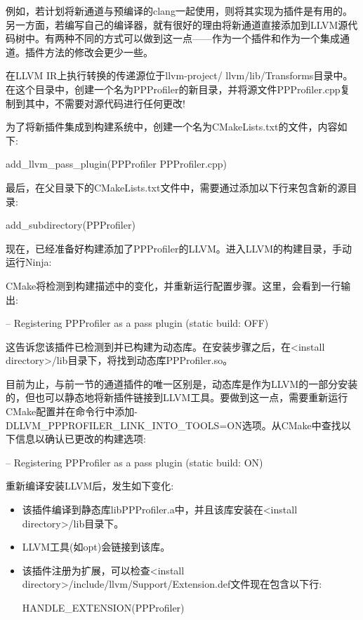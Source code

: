 例如，若计划将新通道与预编译的clang一起使用，则将其实现为插件是有用的。另一方面，若编写自己的编译器，就有很好的理由将新通道直接添加到LLVM源代码树中。有两种不同的方式可以做到这一点——作为一个插件和作为一个集成通道。插件方法的修改会更少一些。


在LLVM IR上执行转换的传递源位于llvm-project/ llvm/lib/Transforms目录中。在这个目录中，创建一个名为PPProfiler的新目录，并将源文件PPProfiler.cpp复制到其中，不需要对源代码进行任何更改!

为了将新插件集成到构建系统中，创建一个名为CMakeLists.txt的文件，内容如下:

\begin{cmake}
add_llvm_pass_plugin(PPProfiler PPProfiler.cpp)
\end{cmake}

最后，在父目录下的CMakeLists.txt文件中，需要通过添加以下行来包含新的源目录:

\begin{cmake}
add_subdirectory(PPProfiler)
\end{cmake}

现在，已经准备好构建添加了PPProfiler的LLVM。进入LLVM的构建目录，手动运行Ninja:


CMake将检测到构建描述中的变化，并重新运行配置步骤。这里，会看到一行输出:

\begin{shell}
-- Registering PPProfiler as a pass plugin (static build: OFF)
\end{shell}

这告诉您该插件已检测到并已构建为动态库。在安装步骤之后，在<install directory>/lib目录下，将找到动态库PPProfiler.so。

目前为止，与前一节的通道插件的唯一区别是，动态库是作为LLVM的一部分安装的，但也可以静态地将新插件链接到LLVM工具。要做到这一点，需要重新运行CMake配置并在命令行中添加-DLLVM\_PPPROFILER\_LINK\_INTO\_TOOLS=ON选项。从CMake中查找以下信息以确认已更改的构建选项:

\begin{shell}
-- Registering PPProfiler as a pass plugin (static build: ON)
\end{shell}

重新编译安装LLVM后，发生如下变化:

\begin{itemize}
\item
该插件编译到静态库libPPProfiler.a中，并且该库安装在<install directory>/lib目录下。

\item
LLVM工具(如opt)会链接到该库。

\item
该插件注册为扩展，可以检查<install directory>/include/llvm/Support/Extension.def文件现在包含以下行:

\begin{shell}
HANDLE_EXTENSION(PPProfiler)
\end{shell}
\end{itemize}

